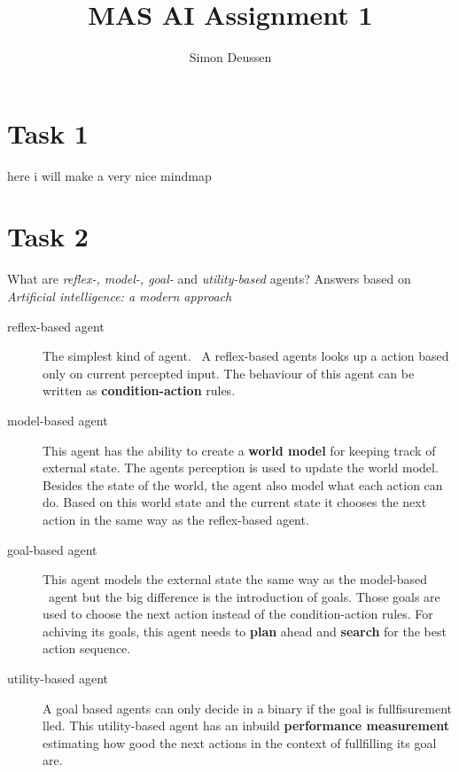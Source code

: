 \documentclass{article}
\title{MAS AI Assignment 1}
\date{}
\author{Simon Deussen}
\begin{document}
  \maketitle

\section*{Task 1}
here i will make a very nice mindmap


\section*{Task 2}
What are  \emph{reflex-, model-, goal-} and \emph{utility-based} agents? Answers based on \emph{Artificial intelligence: a modern approach} \cite{russell_norvig_2014} 

\begin{description}
    \item[reflex-based agent] 
    The simplest kind of agent. \
    A reflex-based agents looks up a action based only on current percepted input. 
    The behaviour of this agent can be written as \textbf{condition-action} rules.
    
    \item[model-based agent] 
    This agent has the ability to create a \textbf{world model} for keeping track of external state.
    The agents perception is used to update the world model. Besides the state of the world, 
    the agent also model what each action can do. Based on this world state and the current 
    state it chooses the next action in the same way as the reflex-based agent.

    \item[goal-based agent] This agent models the external state the same way as the model-based \
    agent but the big difference is the introduction of goals. Those goals are used to
    choose the next action instead of the condition-action rules. For achiving its goals,
    this agent needs to \textbf{plan} ahead and \textbf{search} for the best action sequence.
 
    \item[utility-based agent]
     A goal based agents can only decide in a binary if the goal is fullfisurement lled. 
     This utility-based agent has an inbuild \textbf{performance measurement} estimating how good the next 
     actions in the context of fullfilling its goal are.
  \end{description}
\end{document}
